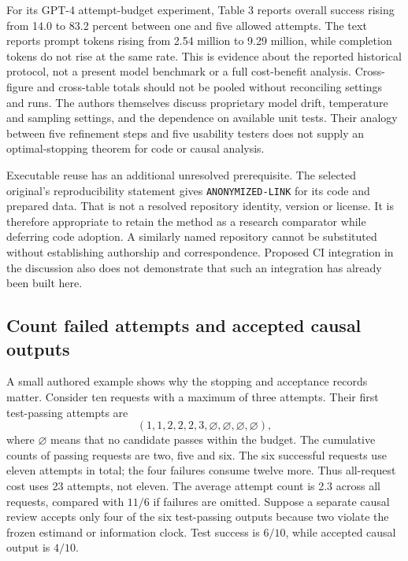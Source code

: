For its GPT-4 attempt-budget experiment, Table 3 reports overall success rising
from 14.0 to 83.2 percent between one and five allowed attempts. The text reports
prompt tokens rising from 2.54 million to 9.29 million, while completion tokens
do not rise at the same rate. This is evidence about the reported historical
protocol, not a present model benchmark or a full cost-benefit analysis.
Cross-figure and cross-table totals should not be pooled without reconciling
settings and runs. The authors themselves discuss proprietary model drift,
temperature and sampling settings, and the dependence on available unit tests.
Their analogy between five refinement steps and five usability testers does
not supply an optimal-stopping theorem for code or causal analysis.
\citep{exec19_selfcorrection_study}

Executable reuse has an additional unresolved prerequisite. The selected
original's reproducibility statement gives \texttt{ANONYMIZED-LINK} for its code
and prepared data. That is not a resolved repository identity, version or
license. It is therefore appropriate to retain the method as a research
comparator while deferring code adoption. A similarly named repository cannot
be substituted without establishing authorship and correspondence. Proposed
CI integration in the discussion also does not demonstrate that such an
integration has already been built here.
\citep{exec19_selfcorrection_study}

\subsection{Count failed attempts and accepted causal outputs}
\label{exec19:ragrepair-accounting}
A small authored example shows why the stopping and acceptance records matter.
Consider ten requests with a maximum of three attempts. Their first test-passing
attempts are
\begin{equation}
 (1,1,2,2,2,3,\varnothing,\varnothing,\varnothing,\varnothing),
 \label{exec19:ragrepair-attempts}
\end{equation}
where $\varnothing$ means that no candidate passes within the budget. The
cumulative counts of passing requests are two, five and six. The six successful
requests use eleven attempts in total; the four failures consume twelve more.
Thus all-request cost uses 23 attempts, not eleven. The average attempt count
is 2.3 across all requests, compared with $11/6$ if failures are omitted.
Suppose a separate causal review accepts only four of the six test-passing
outputs because two violate the frozen estimand or information clock. Test
success is $6/10$, while accepted causal output is $4/10$.
\citep{exec19_retrieval_repair_reference}

